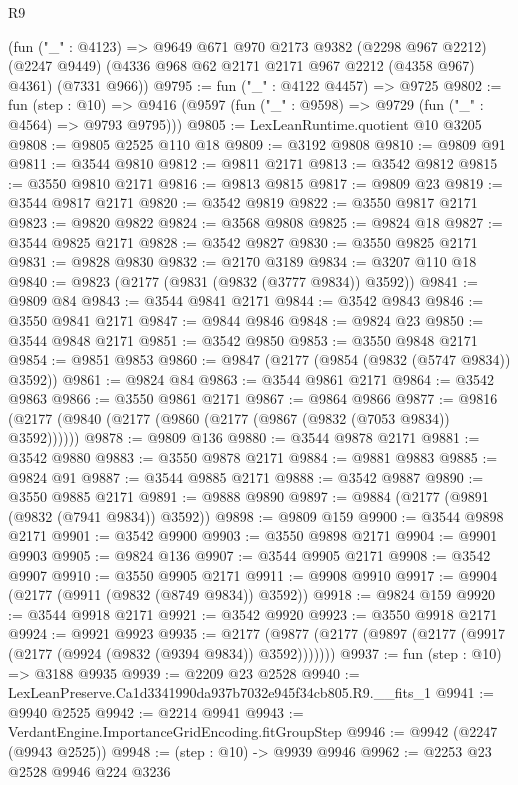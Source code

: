 \begin{lexlean}{R9}
\begin{coremodule}
    (fun ("_" : @4123) =>
    @9649
      @671
      @970
      @2173
      @9382
      (@2298 @967 @2212)
      (@2247 @9449)
      (@4336 @968 @62 @2171 @2171 @967 @2212 (@4358 @967) @4361)
      (@7331 @966))
@9795 := fun ("_" : @4122 @4457) => @9725
@9802 := fun (step : @10) =>
  @9416 (@9597 (fun ("_" : @9598) => @9729 (fun ("_" : @4564) => @9793 @9795)))
@9805 := LexLeanRuntime.quotient @10 @3205
@9808 := @9805 @2525 @110 @18
@9809 := @3192 @9808
@9810 := @9809 @91
@9811 := @3544 @9810
@9812 := @9811 @2171
@9813 := @3542 @9812
@9815 := @3550 @9810 @2171
@9816 := @9813 @9815
@9817 := @9809 @23
@9819 := @3544 @9817 @2171
@9820 := @3542 @9819
@9822 := @3550 @9817 @2171
@9823 := @9820 @9822
@9824 := @3568 @9808
@9825 := @9824 @18
@9827 := @3544 @9825 @2171
@9828 := @3542 @9827
@9830 := @3550 @9825 @2171
@9831 := @9828 @9830
@9832 := @2170 @3189
@9834 := @3207 @110 @18
@9840 := @9823 (@2177 (@9831 (@9832 (@3777 @9834)) @3592))
@9841 := @9809 @84
@9843 := @3544 @9841 @2171
@9844 := @3542 @9843
@9846 := @3550 @9841 @2171
@9847 := @9844 @9846
@9848 := @9824 @23
@9850 := @3544 @9848 @2171
@9851 := @3542 @9850
@9853 := @3550 @9848 @2171
@9854 := @9851 @9853
@9860 := @9847 (@2177 (@9854 (@9832 (@5747 @9834)) @3592))
@9861 := @9824 @84
@9863 := @3544 @9861 @2171
@9864 := @3542 @9863
@9866 := @3550 @9861 @2171
@9867 := @9864 @9866
@9877 := @9816 (@2177 (@9840 (@2177 (@9860 (@2177 (@9867 (@9832 (@7053 @9834)) @3592))))))
@9878 := @9809 @136
@9880 := @3544 @9878 @2171
@9881 := @3542 @9880
@9883 := @3550 @9878 @2171
@9884 := @9881 @9883
@9885 := @9824 @91
@9887 := @3544 @9885 @2171
@9888 := @3542 @9887
@9890 := @3550 @9885 @2171
@9891 := @9888 @9890
@9897 := @9884 (@2177 (@9891 (@9832 (@7941 @9834)) @3592))
@9898 := @9809 @159
@9900 := @3544 @9898 @2171
@9901 := @3542 @9900
@9903 := @3550 @9898 @2171
@9904 := @9901 @9903
@9905 := @9824 @136
@9907 := @3544 @9905 @2171
@9908 := @3542 @9907
@9910 := @3550 @9905 @2171
@9911 := @9908 @9910
@9917 := @9904 (@2177 (@9911 (@9832 (@8749 @9834)) @3592))
@9918 := @9824 @159
@9920 := @3544 @9918 @2171
@9921 := @3542 @9920
@9923 := @3550 @9918 @2171
@9924 := @9921 @9923
@9935 := @2177 (@9877 (@2177 (@9897 (@2177 (@9917 (@2177 (@9924 (@9832 (@9394 @9834)) @3592)))))))
@9937 := fun (step : @10) => @3188 @9935
@9939 := @2209 @23 @2528
@9940 := LexLeanPreserve.Ca1d3341990da937b7032e945f34cb805.R9.__fits_1
@9941 := @9940 @2525
@9942 := @2214 @9941
@9943 := VerdantEngine.ImportanceGridEncoding.fitGroupStep
@9946 := @9942 (@2247 (@9943 @2525))
@9948 := (step : @10) -> @9939 @9946
@9962 := @2253
    @23
    @2528
    @9946
    @224
    @3236

\end{coremodule}
\end{lexlean}
